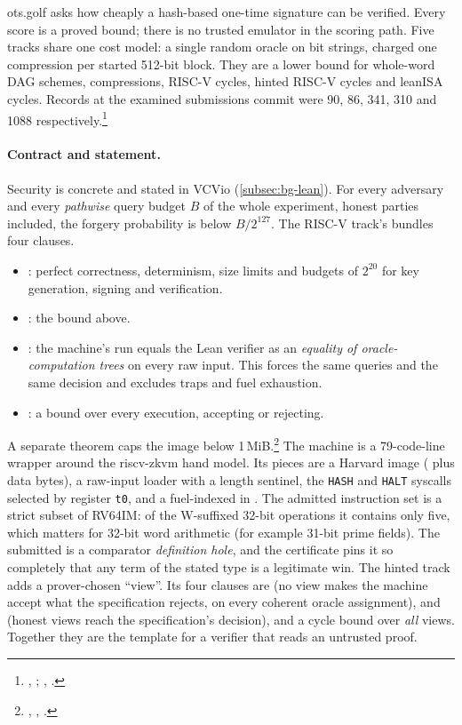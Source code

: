 ots.golf asks how cheaply a hash-based one-time signature can be verified. Every score is a
proved bound; there is no trusted emulator in the scoring path. Five tracks share one cost model:
a single random oracle on bit strings, charged one compression per started 512-bit block. They are
a lower bound for whole-word DAG schemes, compressions, RISC-V cycles, hinted RISC-V cycles and
leanISA cycles. Records at the examined submissions commit were 90, 86, 341, 310 and 1088
respectively.\footnote{, ;
, .}

\paragraph{Contract and statement.} Security is concrete and stated in VCVio (\cref{subsec:bg-lean}).
For every adversary and every \emph{pathwise} query budget $B$ of the whole experiment, honest
parties included, the forgery probability is below $B/2^{127}$. The RISC-V track's
 bundles four clauses.
\begin{itemize}[nosep]
\item {}: perfect correctness, determinism, size limits and budgets of $2^{20}$
  for key generation, signing and verification.
\item {}: the bound above.
\item {}: the machine's run equals the Lean verifier as an \emph{equality of
  oracle-computation trees} on every raw input. This forces the same queries and the same decision
  and excludes traps and fuel exhaustion.
\item {}: a bound over every execution, accepting or rejecting.
\end{itemize}
A separate theorem caps the image below 1\,MiB.\footnote{,
, .}
The machine is a 79-code-line wrapper around the riscv-zkvm hand model. Its pieces are a Harvard
image ( plus data bytes), a raw-input loader with a length sentinel, the
\texttt{HASH} and \texttt{HALT} syscalls selected by register \texttt{t0}, and a fuel-indexed
 in . The admitted instruction set is a strict subset of RV64IM:
of the W-suffixed 32-bit operations it contains only five, which matters for
32-bit word arithmetic (for example 31-bit prime fields). The submitted  is a comparator \emph{definition hole}, and the
certificate pins it so completely that any term of the stated type is a legitimate win. The hinted
track adds a prover-chosen ``view''. Its four clauses are  (no view makes the machine
accept what the specification rejects, on every coherent oracle assignment),  and
 (honest views reach the specification's decision), and a cycle bound over \emph{all}
views. Together they are the template for a verifier that reads an untrusted proof.

